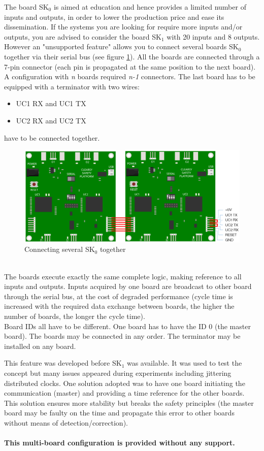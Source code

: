 The board SK$_0$ is aimed at education and hence provides a limited number of inputs and outputs, in order to lower the production price and ease its dissemination. If the systems you are looking for require more inputs and/or outputs, you are advised to consider the board SK$_1$ with 20 inputs and 8 outputs. \\
However an "unsupported feature" allows you to connect several boards SK$_0$ together via their serial bus (see figure \ref{annexes:SK0-HW-serial-bus}). All the boards are connected through a 7-pin connector (each pin is propagated at the same position to the next board). A configuration with \textit{n} boards required  \textit{n-1} connectors. The last board has to be equipped with a terminator with two wires: 
\begin{itemize}
    \item UC1 RX and UC1 TX
    \item UC2 RX and UC2 TX 
\end{itemize}
have to be connected together.
\begin{figure}[h]
\centering\includegraphics[scale=0.30]{Pictures/chapterAnnexes/SK0-connectinb-boards.png}
\caption{Connecting several SK$_0$ together}
\label{annexes:SK0-HW-serial-bus}
\end{figure} \\
The boards execute exactly the same complete logic, making reference to all inputs and outputs. Inputs acquired by one board are broadcast to other board through the serial bus, at the cost of degraded performance (cycle time is increased with the required data exchange between boards, the higher the number of boards, the longer the cycle time).\\

Board IDs all have to be different. One board has to have the ID 0 (the master board). The boards may be connected in any order. The terminator may be installed on any board.

This feature was developed before SK$_1$ was available. It was used to test the concept but many issues appeared during experiments including jittering distributed clocks. One solution adopted was to have one board initiating the communication (master) and providing a time reference for the other boards. This solution ensures more stability but breaks the safety principles (the master board may be faulty on the time and propagate this error to other boards without means of detection/correction). \\\\
\textbf{\color{ocre}This multi-board configuration is provided without any support.} 



